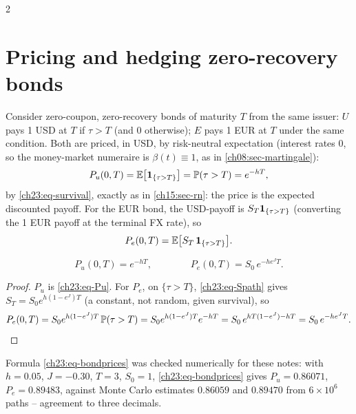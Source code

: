 \begin{paracol}{2}
\section{Pricing and hedging zero-recovery bonds}\label{ch23:sec-pricing}
Consider zero-coupon, zero-recovery bonds of maturity $T$ from the same issuer: $U$ pays 1 USD at $T$ if
$\tau>T$ (and $0$ otherwise); $E$ pays 1 EUR at $T$ under the same condition. Both are priced, in USD, by
risk-neutral expectation (interest rates $0$, so the money-market numeraire is $\beta(t)\equiv1$, as in
\cref{ch08:sec-martingale}):
\begin{equation}\label{ch23:eq-Pu}
  P_u(0,T)=\mathbb{E}\bigl[\mathbf{1}_{\{\tau>T\}}\bigr]=\mathbb{P}(\tau>T)=e^{-hT},
\end{equation}
by \cref{ch23:eq-survival}, exactly as in \cref{ch15:sec-rn}: the price is the expected discounted payoff. For the
EUR bond, the USD-payoff is $S_T\mathbf{1}_{\{\tau>T\}}$ (converting the 1 EUR payoff at the terminal FX rate), so
\begin{equation}\label{ch23:eq-Pe-setup}
  P_e(0,T)=\mathbb{E}\bigl[S_T\,\mathbf{1}_{\{\tau>T\}}\bigr].
\end{equation}

\begin{proposition}\label{ch23:prop-bondprices}
\begin{equation}\label{ch23:eq-bondprices}
  P_u(0,T)=e^{-hT},\qquad\qquad P_e(0,T)=S_0\,e^{-h e^{J}T}.
\end{equation}
\end{proposition}
\begin{proof}
$P_u$ is \cref{ch23:eq-Pu}. For $P_e$, on $\{\tau>T\}$, \cref{ch23:eq-Spath} gives $S_T=S_0e^{h(1-e^J)T}$ (a constant,
not random, given survival), so
\[
  P_e(0,T)=S_0e^{h(1-e^J)T}\,\mathbb{P}(\tau>T)=S_0e^{h(1-e^J)T}e^{-hT}=S_0\,e^{hT(1-e^J)-hT}=S_0\,e^{-h e^JT}.
  \qedhere
\]
\end{proof}
Formula \eqref{ch23:eq-bondprices} was checked numerically for these notes: with $h=0.05$, $J=-0.30$, $T=3$,
$S_0=1$, \cref{ch23:eq-bondprices} gives $P_u=0.86071$, $P_e=0.89483$, against Monte Carlo estimates $0.86059$ and
$0.89470$ from $6\times10^6$ paths -- agreement to three decimals.


\end{paracol}
